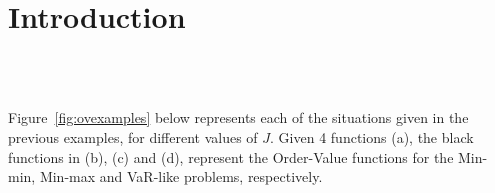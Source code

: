 
\chapter{Introduction} %

\label{Chapter1}

\lipsum[1]\\
\lipsum[1]\\
\lipsum[1]

Figure~\ref{fig:ovexamples} below represents each of the situations given in the previous examples, for different values of $J$. Given 4 functions (a), the black functions in (b), (c) and (d), represent the Order-Value functions for the Min-min, Min-max and VaR-like problems, respectively. 
